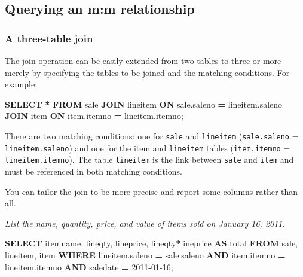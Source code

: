 \documentclass[
]{article}
\newenvironment{Shaded}{\begin{snugshade}}{\end{snugshade}}
\newcommand{\KeywordTok}[1]{\textcolor[rgb]{0.13,0.29,0.53}{\textbf{#1}}}
\newcommand{\NormalTok}[1]{#1}
\newcommand{\OperatorTok}[1]{\textcolor[rgb]{0.81,0.36,0.00}{\textbf{#1}}}
\newcommand{\StringTok}[1]{\textcolor[rgb]{0.31,0.60,0.02}{#1}}
\begin{document}
\hypertarget{querying-an-mm-relationship}{%
\subsection{Querying an m:m
relationship}\label{querying-an-mm-relationship}}

\hypertarget{a-three-table-join}{%
\subsubsection{A three-table join}\label{a-three-table-join}}

The join operation can be easily extended from two tables to three or
more merely by specifying the tables to be joined and the matching
conditions. For example:

\begin{Shaded}
\begin{Highlighting}[]
\KeywordTok{SELECT} \OperatorTok{*} \KeywordTok{FROM}\NormalTok{ sale }\KeywordTok{JOIN}\NormalTok{ lineitem}
    \KeywordTok{ON}\NormalTok{ sale.saleno }\OperatorTok{=}\NormalTok{ lineitem.saleno}
    \KeywordTok{JOIN}\NormalTok{ item}
    \KeywordTok{ON}\NormalTok{ item.itemno }\OperatorTok{=}\NormalTok{ lineitem.itemno;}
\end{Highlighting}
\end{Shaded}

There are two matching conditions: one for \texttt{sale} and
\texttt{lineitem} (\texttt{sale.saleno} = \texttt{lineitem.saleno}) and
one for the item and \texttt{lineitem} tables (\texttt{item.itemno} =
\texttt{lineitem.itemno}). The table \texttt{lineitem} is the link
between \texttt{sale} and \texttt{item} and must be referenced in both
matching conditions.

You can tailor the join to be more precise and report some columns
rather than all.

\emph{List the name, quantity, price, and value of items sold on January
16, 2011.}

\begin{Shaded}
\begin{Highlighting}[]
\KeywordTok{SELECT}\NormalTok{ itemname, lineqty, lineprice, lineqty}\OperatorTok{*}\NormalTok{lineprice }\KeywordTok{AS}\NormalTok{ total}
    \KeywordTok{FROM}\NormalTok{ sale, lineitem, item}
        \KeywordTok{WHERE}\NormalTok{ lineitem.saleno }\OperatorTok{=}\NormalTok{ sale.saleno}
        \KeywordTok{AND}\NormalTok{ item.itemno }\OperatorTok{=}\NormalTok{ lineitem.itemno}
        \KeywordTok{AND}\NormalTok{ saledate }\OperatorTok{=} \StringTok{\textquotesingle{}2011{-}01{-}16\textquotesingle{}}\NormalTok{;}
\end{Highlighting}
\end{Shaded}
\end{document}

